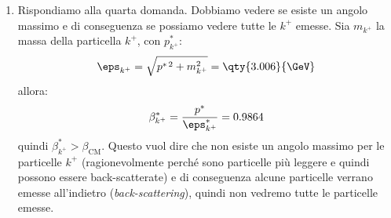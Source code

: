 \begin{example}
\begin{enumerate}
		\item Rispondiamo alla quarta domanda.
		      Dobbiamo vedere se esiste un angolo massimo e di conseguenza se
		      possiamo vedere tutte le $k^+$ emesse.
		      Sia $m _{k^+}$ la massa della particella $k^+$, con
		      $p ^{\ast} _{k^+}$:
		      \begin{equation}
			      \eps _{k^+}
			      = \sqrt{p ^{\ast\, 2} + m _{k^+}^{2}}
			      = \qty{3.006}{\GeV}
		      \end{equation}
		      allora:
		      \begin{equation}
			      \beta _{k^+}^{\ast}
			      = \frac{p ^{\ast}}{\eps _{k^+}^{\ast}}
			      = 0.9864
		      \end{equation}
		      quindi $\beta _{k^+}^{\ast} > \beta _\text{CM}$. Questo vuol dire che
		      non esiste un angolo massimo per le particelle $k^+$ (ragionevolmente
		      perché sono particelle più leggere e quindi possono essere
		      back-scatterate) e di conseguenza alcune particelle verrano emesse
		      all'indietro (\textit{back-scattering}), quindi non vedremo
		      tutte le particelle emesse.


\end{enumerate}
\end{example}
